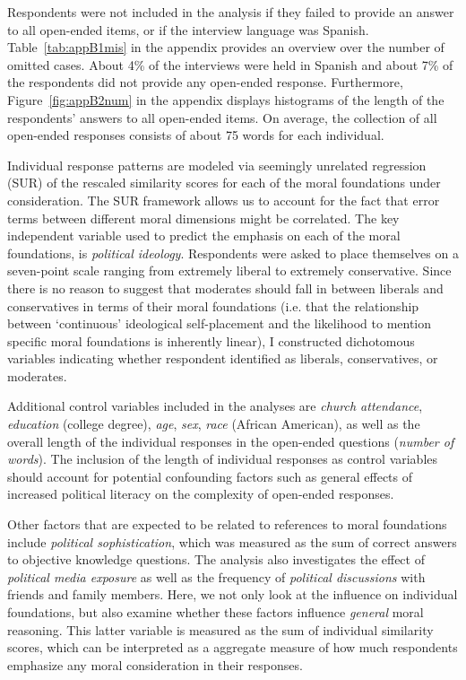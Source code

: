 \documentclass[12pt]{article}
\begin{document}
Respondents were not included in the analysis if they failed to provide an answer to all open-ended items, or if the interview language was Spanish. Table~\ref{tab:appB1mis} in the appendix provides an overview over the number of omitted cases. About 4\% of the interviews were held in Spanish and about 7\% of the respondents did not provide any open-ended response. Furthermore, Figure~\ref{fig:appB2num} in the appendix displays histograms of the length of the respondents' answers to all open-ended items. On average, the collection of all open-ended responses consists of about 75 words for each individual.

Individual response patterns are modeled via seemingly unrelated regression (SUR) of the rescaled similarity scores for each of the moral foundations under consideration. The SUR framework allows us to account for the fact that error terms between different moral dimensions might be correlated. The key independent variable used to predict the emphasis on each of the moral foundations, is \textit{political ideology}. Respondents were asked to place themselves on a seven-point scale ranging from extremely liberal to extremely conservative. Since there is no reason to suggest that moderates should fall in between liberals and conservatives in terms of their moral foundations (i.e. that the relationship between `continuous' ideological self-placement and the likelihood to mention specific moral foundations is inherently linear), I constructed dichotomous variables indicating whether respondent identified as liberals, conservatives, or moderates.

Additional control variables included in the analyses are \textit{church attendance}, \textit{education} (college degree), \textit{age}, \textit{sex}, \textit{race} (African American), as well as the overall length of the individual responses in the open-ended questions (\textit{number of words}). The inclusion of the length of individual responses as control variables should account for potential confounding factors such as general effects of increased political literacy on the complexity of open-ended responses.

Other factors that are expected to be related to references to moral foundations include \textit{political sophistication}, which was measured as the sum of correct answers to objective knowledge questions. The analysis also investigates the effect of \textit{political media exposure} as well as the frequency of \textit{political discussions} with friends and family members. Here, we not only look at the influence on individual foundations, but also examine whether these factors influence \textit{general} moral reasoning. This latter variable is measured as the sum of individual similarity scores, which can be interpreted as a aggregate measure of how much respondents emphasize any moral consideration in their responses.
\end{document}
